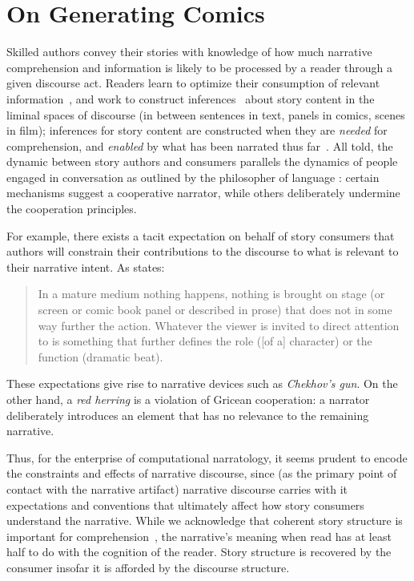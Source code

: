\section{On Generating Comics}

Skilled authors convey their stories with knowledge of how much narrative
comprehension and information is likely to be processed by a reader
through a given discourse act.
Readers learn to optimize their consumption of
relevant information~\cite{pirolli2007information}, and work to construct
inferences~\cite{magliano2016filling} about story content in the liminal spaces
of discourse (in between sentences in text, panels in comics, scenes in film);
inferences for story content are constructed when they are \emph{needed} for
comprehension, and \emph{enabled} by what has been narrated thus
far~\cite{myers1987degree}. All told, the dynamic between story authors and
consumers parallels the dynamics of people engaged in conversation as
outlined by the philosopher of language : certain
mechanisms suggest a cooperative narrator, while others deliberately
undermine the cooperation principles.

For example, there 
exists a tacit expectation on behalf of story consumers that authors
will constrain their contributions to the discourse to what is relevant to
their narrative intent. As  states:
%
\begin{quote} 
	In a mature medium nothing happens, nothing is brought on stage (or screen 
	or comic book panel or described in prose) that does not in some way further 
	the action. Whatever the viewer is invited to direct attention to is
	something that further defines the role ([of a] character) or the function 
	(dramatic beat). 
	\end{quote}
%
These expectations give rise to narrative devices such as \emph{Chekhov's
gun}. On the other hand, a \emph{red herring} is a violation of Gricean
cooperation: a narrator deliberately introduces an element that
has no relevance to the remaining narrative.


Thus, for the enterprise of computational narratology, it seems prudent to
encode the constraints and effects of narrative discourse, since (as the
primary point of contact with the narrative artifact) narrative discourse
carries with it expectations and conventions that ultimately affect how
story consumers understand the narrative. While we acknowledge that
coherent story structure is important for
comprehension~\cite{graesser2002how}, the narrative's meaning when read has
at least half to do with the cognition of the reader.  Story structure is
recovered by the consumer insofar it is afforded by the discourse
structure. 

